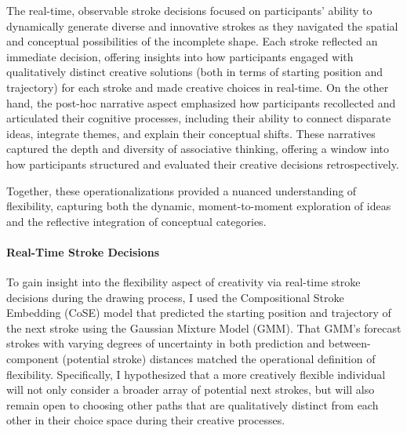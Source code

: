 \documentclass[../MA_Thesis.tex]{subfiles}
\begin{document}
The real-time, observable stroke decisions focused on participants’ ability to dynamically generate diverse and innovative strokes as they navigated the spatial and conceptual possibilities of the incomplete shape. Each stroke reflected an immediate decision, offering insights into how participants engaged with qualitatively distinct creative solutions (both in terms of starting position and trajectory) for each stroke and made creative choices in real-time. On the other hand, the post-hoc narrative aspect emphasized how participants recollected and articulated their cognitive processes, including their ability to connect disparate ideas, integrate themes, and explain their conceptual shifts. These narratives captured the depth and diversity of associative thinking, offering a window into how participants structured and evaluated their creative decisions retrospectively.

Together, these operationalizations provided a nuanced understanding of flexibility, capturing both the dynamic, moment-to-moment exploration of ideas and the reflective integration of conceptual categories.

\paragraph*{Real-Time Stroke Decisions}
To gain insight into the flexibility aspect of creativity via real-time stroke decisions during the drawing process, I used the Compositional Stroke Embedding (CoSE) model that predicted the starting position and trajectory of the next stroke using the Gaussian Mixture Model (GMM). That GMM's forecast strokes with varying degrees of uncertainty in both prediction and between-component (potential stroke) distances matched the operational definition of flexibility. Specifically, I hypothesized that a more creatively flexible individual will not only consider a broader array of potential next strokes, but will also remain open to choosing other paths that are qualitatively distinct from each other in their choice space during their creative processes.
\end{document}
